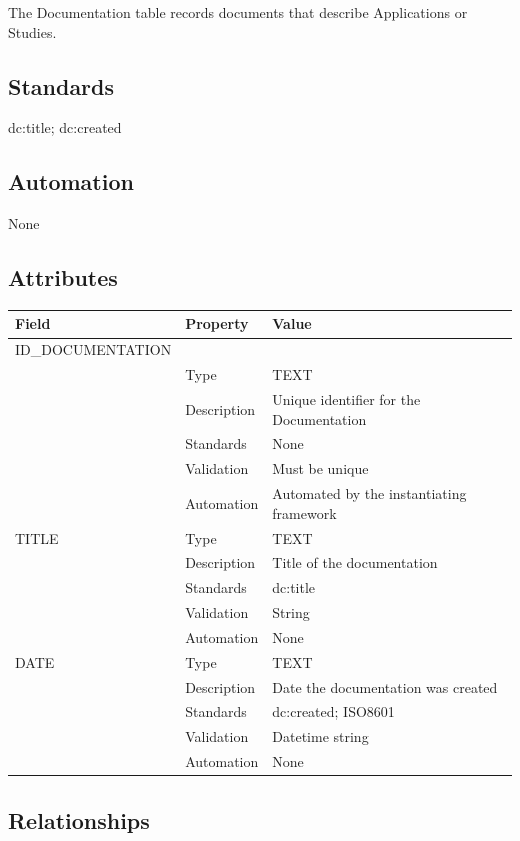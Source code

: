 The Documentation table records documents that describe Applications or
Studies.

\subsection{Standards}\label{standards-13}

dc:title; dc:created

\subsection{Automation}\label{automation-13}

None

\subsection{Attributes}\label{attributes-13}

\begin{longtable}[]{@{}lll@{}}
\toprule\noalign{}
Field & Property & Value \\
\midrule\noalign{}
\endhead
\bottomrule\noalign{}
\endlastfoot
ID\_DOCUMENTATION & & \\
& Type & TEXT \\
& Description & Unique identifier for the Documentation \\
& Standards & None \\
& Validation & Must be unique \\
& Automation & Automated by the instantiating framework \\
TITLE & Type & TEXT \\
& Description & Title of the documentation \\
& Standards & dc:title \\
& Validation & String \\
& Automation & None \\
DATE & Type & TEXT \\
& Description & Date the documentation was created \\
& Standards & dc:created; ISO8601 \\
& Validation & Datetime string \\
& Automation & None \\
\end{longtable}

\subsection{Relationships}\label{relationships-9}

